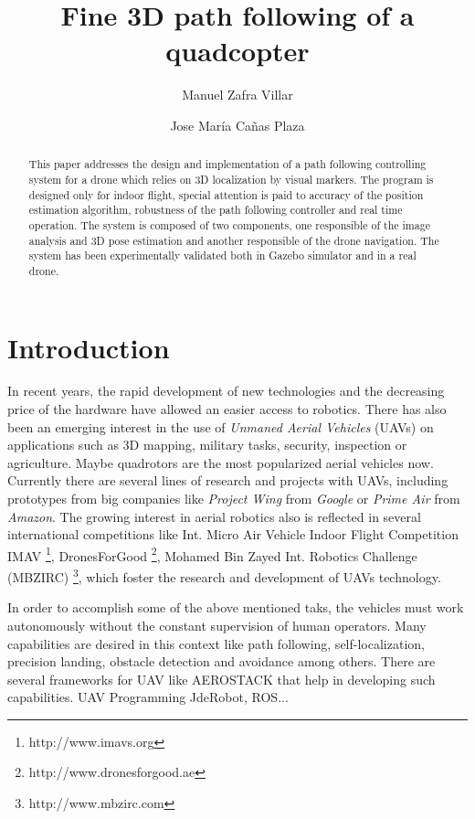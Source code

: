 \documentclass{styles/svproc}
\begin{document}
\title{Fine 3D path following of a quadcopter}
\author{Manuel Zafra Villar \and Jose María Cañas Plaza}
\maketitle

\begin{abstract}
This paper addresses the design and implementation of a path following controlling system for a drone which relies on 3D localization by visual markers. The program is designed only for indoor flight, special attention is paid to accuracy of the position estimation algorithm, robustness of the path following controller and real time operation. The system is composed of two components, one responsible of the image analysis and 3D pose estimation and another responsible of the drone navigation. The system has been experimentally validated both in Gazebo simulator and in a real drone. 
\end{abstract}

\section{Introduction}

	In recent years, the rapid development of new technologies and the decreasing price of the hardware have allowed an easier access to robotics. There has also been an emerging interest in the use of \textit{Unmaned Aerial Vehicles} (UAVs) on applications such as 3D mapping, military tasks, security, inspection \cite{nikolic2014} or agriculture. Maybe quadrotors are the most popularized aerial vehicles now. Currently there are several lines of research and projects with UAVs, including prototypes from big companies like \textit{Project Wing} from \textit{Google} or \textit{Prime Air} from \textit{Amazon}. 
        The growing interest in aerial robotics also is reflected in several international competitions like Int. Micro Air Vehicle Indoor Flight Competition IMAV \footnote{http://www.imavs.org}, DronesForGood \footnote{http://www.dronesforgood.ae}, Mohamed Bin Zayed Int. Robotics Challenge (MBZIRC) \footnote{http://www.mbzirc.com}, which foster the research and development of UAVs technology.


	In order to accomplish some of the above mentioned taks, the vehicles must work autonomously without the constant supervision of human operators. Many capabilities are desired in this context like path following, self-localization, precision landing, obstacle detection and avoidance among others. There are several frameworks for UAV like AEROSTACK \cite{sanchezlopez2016} that help in developing such capabilities. UAV Programming JdeRobot, ROS...
\end{document}

